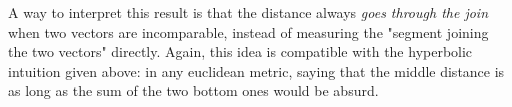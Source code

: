 A way to interpret this result is that the distance always \textit{goes through the join} when two vectors are incomparable, instead of measuring the "segment joining the two vectors" directly. Again, this idea is compatible with the hyperbolic intuition given above: in any euclidean metric, saying that the middle distance is as long as the sum of the two bottom ones would be absurd.